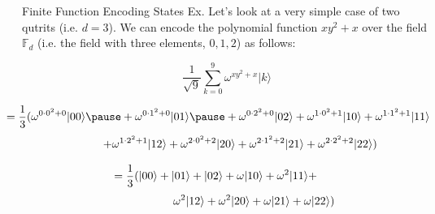 \documentclass[xcolor=dvipsnames]{beamer}
\begin{document}
\begin{frame}{Finite Function Encoding States Ex.}
Let's look at a very simple case of two qutrits (i.e. $d=3$). We can encode the polynomial function $xy^2+x$ over
the field $\mathbb{F}_d$ (i.e. the field with three elements, $0,1,2$) as follows:

$$
                   \frac{1}{\sqrt{9}}\sum_{k=0}^{9}\omega^{xy^2+x}\vert k \rangle        
$$

$$
      \hspace{-.5cm}    =\frac{1}{3}(\omega^{0\cdot0^2+0}\vert 00\rangle\pause + \omega^{0\cdot1^2+0}\vert 01\rangle\pause + \omega^{0\cdot2^2+0}\vert 02\rangle
          + \omega^{1\cdot0^2+1} \vert 10\rangle + \omega^{1\cdot1^2+1} \vert 11\rangle  
          $$
          \vspace{-.7cm}
          $$ \hspace{.83cm}+ \omega^{1\cdot2^2+1}\vert 12\rangle +\omega^{2\cdot0^2+2} \vert 20\rangle 
          + \omega^{2\cdot1^2+2} \vert 21\rangle + \omega^{2\cdot2^2+2} \vert 22\rangle  )   
        $$
        
        $$
          =\frac{1}{3}(\vert 00\rangle + \vert 01\rangle + \vert 02\rangle
          + \omega \vert 10\rangle + \omega^2 \vert 11\rangle +\hspace{.7cm}
          $$
          \vspace{-.63cm}
          $$ \hspace{1.7cm} \omega^2 \vert 12\rangle +\omega^2 \vert 20\rangle 
          + \omega \vert 21\rangle + \omega \vert 22\rangle  )   
        $$
        
\end{frame}        
        
\end{document}
